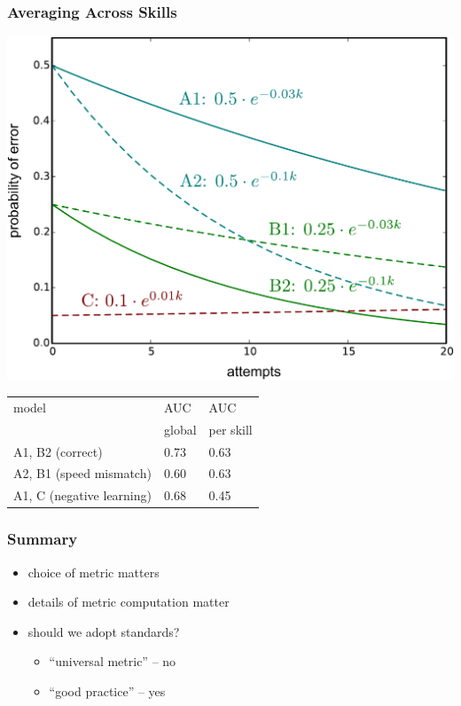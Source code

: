 \documentclass[bigger]{beamer}
\begin{document}
\begin{frame}
  \frametitle{Averaging Across Skills}

  \begin{center}
    \includegraphics[width=.5\linewidth]{scenario-skillavg}

    \medskip
    \begin{tabular}{lll}
      \toprule
      model & AUC & AUC \\
      & global & per skill \\
      \midrule
      A1, B2 (correct) & 0.73  & 0.63 \\
      A2, B1 (speed mismatch) & 0.60 & 0.63 \\
      A1, C (negative learning) & 0.68  &  0.45 \\
      \bottomrule  
    \end{tabular}
  \end{center}
\end{frame}

\begin{frame}
  \frametitle{Summary}

  \begin{itemize}
  \item choice of metric matters
  \item details of metric computation matter
  \item should we adopt standards?
    \begin{itemize}
    \item ``universal metric'' -- no
    \item ``good practice'' -- yes
    \end{itemize}
  \end{itemize}
\end{frame}
\end{document}
